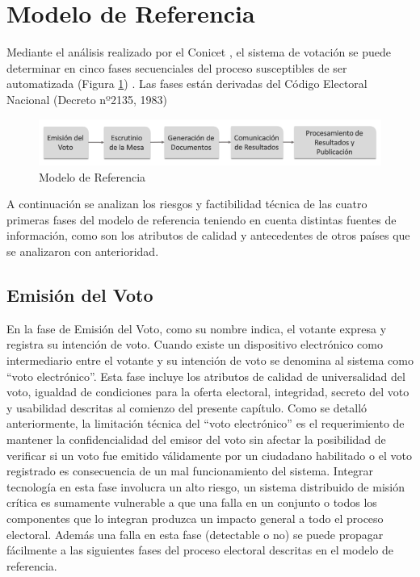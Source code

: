 \section{Modelo de Referencia}
Mediante el análisis realizado por el Conicet \cite{conicet}, el sistema de votación se puede determinar en cinco fases secuenciales del proceso susceptibles de ser automatizada (Figura \ref{graf:modeloReferencia}) . Las fases están derivadas del Código Electoral Nacional (Decreto nº2135, 1983) \cite{decreto}

\begin{figure}[h!]
    \begin{center}
        \includegraphics[width=\textwidth]{img/modeloReferencia.png}
    \end{center}
  \caption{Modelo de Referencia}
  \label{graf:modeloReferencia}
\end{figure}

A continuación se analizan los riesgos y factibilidad técnica de las cuatro primeras fases del modelo de referencia teniendo en cuenta distintas fuentes de información, como son los atributos de calidad y antecedentes de otros países que se analizaron con anterioridad. 

\subsection{Emisión del Voto} 
En la fase de Emisión del Voto, como su nombre indica, el votante expresa y registra su intención de voto. Cuando existe un dispositivo electrónico como intermediario entre el votante y su intención de voto se denomina al sistema como ``voto electrónico''. Esta fase incluye los atributos de calidad de universalidad del voto, igualdad de condiciones para la oferta electoral, integridad, secreto del voto y usabilidad descritas al comienzo del presente capítulo. Como se detalló anteriormente, la limitación técnica del ``voto electrónico'' es el requerimiento de mantener la confidencialidad del emisor del voto sin afectar la posibilidad de verificar si un voto fue emitido válidamente por un ciudadano habilitado o el voto registrado es consecuencia de un mal funcionamiento del sistema. Integrar tecnología en esta fase involucra un alto riesgo, un sistema distribuido de misión crítica es sumamente vulnerable a que una falla en un conjunto o todos los componentes que lo integran produzca un impacto general a todo el proceso electoral. Además una falla en esta fase (detectable o no) se puede propagar fácilmente a las siguientes fases del proceso electoral descritas en el modelo de referencia. 

